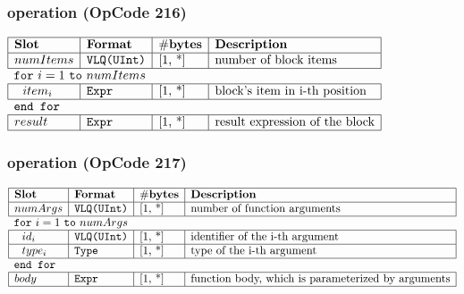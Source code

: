 \subsubsection{ operation (OpCode 216)}

\noindent
\(\begin{array}{| l | l | l | l |}
    \hline
    \bf{Slot} & \bf{Format} & \bf{\#bytes} & \bf{Description} \\
    \hline
         numItems & \lst{VLQ(UInt)} & \text{[1, *]} & \text{number of block items} \\
    \hline
          \multicolumn{4}{l}{\lst{for}~i=1~\lst{to}~numItems} \\
    \hline
             ~~ item_i & \lst{Expr} & \text{[1, *]} & \text{block's item in i-th position} \\
    \hline
          \multicolumn{4}{l}{\lst{end for}} \\\hline
     result & \lst{Expr} & \text{[1, *]} & \text{result expression of the block} \\
    \hline
      
\end{array}\)
       

\subsubsection{ operation (OpCode 217)}

\noindent
\(\begin{array}{| l | l | l | l |}
    \hline
    \bf{Slot} & \bf{Format} & \bf{\#bytes} & \bf{Description} \\
    \hline
         numArgs & \lst{VLQ(UInt)} & \text{[1, *]} & \text{number of function arguments} \\
    \hline
          \multicolumn{4}{l}{\lst{for}~i=1~\lst{to}~numArgs} \\
    \hline
             ~~ id_i & \lst{VLQ(UInt)} & \text{[1, *]} & \text{identifier of the i-th argument} \\
    \hline
          ~~ type_i & \lst{Type} & \text{[1, *]} & \text{type of the i-th argument} \\
    \hline
          \multicolumn{4}{l}{\lst{end for}} \\\hline
     body & \lst{Expr} & \text{[1, *]} & \text{function body, which is parameterized by arguments} \\
    \hline
      
\end{array}\)
       

